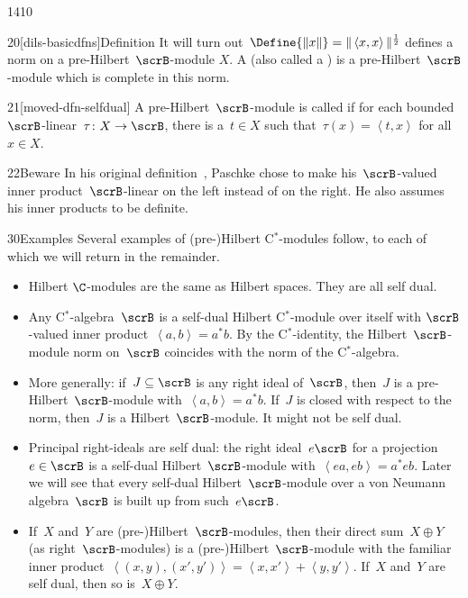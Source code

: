 \begin{parsec}{1410}
\begin{point}{20}[dils-basicdfns]{Definition}
It will turn out~$\Define{\| x \|} = \| \left<x,x\right> \|^{\frac{1}{2}}$
        defines a norm on a pre-Hilbert~$\scrB$-module $X$.
A 
    (also called a )
    is a pre-Hilbert~$\scrB$-module
    which is complete in this norm.
\begin{point}{21}[moved-dfn-selfdual]%
A pre-Hilbert~$\scrB$-module is called 
    if for each bounded~$\scrB$-linear~$\tau\colon X \to \scrB$,
                there is a~$t \in X$ such that~$\tau(x) = \left<t,x\right>$
                    for all~$x \in X$.
\end{point}
\begin{point}{22}{Beware}%
In his original definition~\cite[\S2.1]{paschke}, Paschke
    chose to make his~$\scrB$-valued inner product~$\scrB$-linear
    on the left instead of on the right.
He also assumes his inner products to be definite.
\end{point}
\end{point}
\begin{point}{30}{Examples}%
    Several examples\cite{paschke} of (pre-)Hilbert C$^*$-modules follow,
    to each of which we will return in the remainder.
\begin{itemize}
\item
Hilbert $\C$-modules are the same as Hilbert spaces.
They are all self dual.

\item
Any C$^*$-algebra~$\scrB$ is a self-dual Hilbert C$^*$-module over itself
    with $\scrB$-valued inner product~$\left<a,b\right> = a^*b$.
By the C$^*$-identity, the Hilbert~$\scrB$-module
    norm on~$\scrB$ coincides with
    the norm of the C$^*$-algebra.

\item
More generally: if~$J \subseteq \scrB$
    is any right ideal of~$\scrB$,
    then~$J$ is a pre-Hilbert~$\scrB$-module
    with~$\left<a,b\right> = a^*b$.
If~$J$ is closed with respect to the norm, then~$J$ is a Hilbert~$\scrB$-module.
It might not be self dual.

\item
Principal right-ideals are self dual:
    the right ideal~$e \scrB$ for a projection~$e \in \scrB$
    is a self-dual Hilbert~$\scrB$-module with~$\left<ea,eb\right> = a^*eb$.
Later we will see that every self-dual
    Hilbert~$\scrB$-module over a von Neumann algebra~$\scrB$
        is built up from such~$e \scrB$.
    
\item
If~$X$ and~$Y$ are (pre-)Hilbert~$\scrB$-modules,
        then their direct sum~$X \oplus Y$ (as right~$\scrB$-modules)
    is a (pre-)Hilbert~$\scrB$-module
    with the familiar inner product~$\left<(x,y), (x',y')\right>
                = \left<x,x'\right>+\left<y,y'\right>$.
If~$X$ and~$Y$ are self dual, then so is~$X \oplus Y$.
\end{itemize}
\end{point}
\end{parsec}
